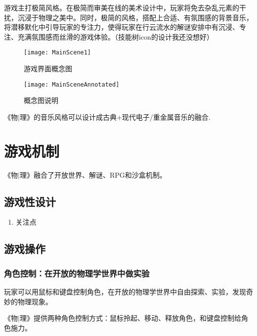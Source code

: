 \documentclass{tstextbook}
\begin{document}
游戏主打极简风格。在极简而审美在线的美术设计中，玩家将免去杂乱元素的干扰，沉浸于物理之美中。同时，极简的风格，搭配上合适、有氛围感的背景音乐，将潜移默化中引导玩家的专注力，使得玩家在行云流水的解谜安排中有沉浸、专注、充满氛围感而丝滑的游戏体验。（技能树icon的设计我还没想好）

\begin{figure}[H]
\centering
\texttt{[image: MainScene1]} 
\caption{游戏界面概念图}
\label{MainScene}
\end{figure}

\begin{figure}[H]
\centering
\texttt{[image: MainSceneAnnotated]} 
\caption{概念图说明}
\label{MainScene}
\end{figure}

《物$|$理》的音乐风格可以设计成古典+现代电子/重金属音乐的融合.

\chapter{游戏机制}

\begin{summary}
《物$|$理》融合了开放世界、解谜、RPG和沙盒机制。
\end{summary}

\section{游戏性设计}

\begin{enumerate}

\item{关注点}



\end{enumerate}


\section{游戏操作}

\subsection{角色控制：在开放的物理学世界中做实验}

玩家可以用鼠标和键盘控制角色，在开放的物理学世界中自由探索、实验，发现奇妙的物理现象。

《物$|$理》提供两种角色控制方式：鼠标拎起、移动、释放角色，和键盘控制给角色施力。
\end{document}
